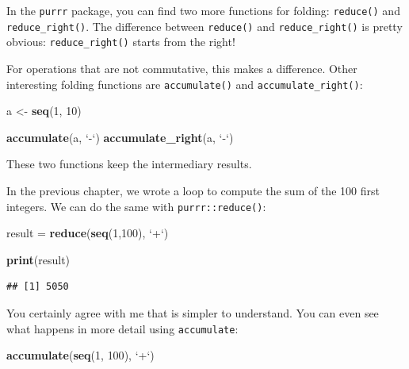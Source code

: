 \documentclass[]{gitbook}
\newenvironment{Shaded}{\begin{snugshade}}{\end{snugshade}}
\newcommand{\DataTypeTok}[1]{\textcolor[rgb]{0.13,0.29,0.53}{#1}}
\newcommand{\DecValTok}[1]{\textcolor[rgb]{0.00,0.00,0.81}{#1}}
\newcommand{\KeywordTok}[1]{\textcolor[rgb]{0.13,0.29,0.53}{\textbf{#1}}}
\newcommand{\NormalTok}[1]{#1}
\newcommand{\StringTok}[1]{\textcolor[rgb]{0.31,0.60,0.02}{#1}}
\theoremstyle{definition}
\theoremstyle{definition}
\theoremstyle{definition}
\theoremstyle{remark}
\begin{document}
In the \texttt{purrr} package, you can find two more functions for
folding: \texttt{reduce()} and \texttt{reduce\_right()}. The difference
between \texttt{reduce()} and \texttt{reduce\_right()} is pretty
obvious: \texttt{reduce\_right()} starts from the right!

For operations that are not commutative, this makes a difference. Other
interesting folding functions are \texttt{accumulate()} and
\texttt{accumulate\_right()}:

\begin{Shaded}
\begin{Highlighting}[]
\NormalTok{a <-}\StringTok{ }\KeywordTok{seq}\NormalTok{(}\DecValTok{1}\NormalTok{, }\DecValTok{10}\NormalTok{)}

\KeywordTok{accumulate}\NormalTok{(a, }\StringTok{`}\DataTypeTok{-}\StringTok{`}\NormalTok{)}
\KeywordTok{accumulate_right}\NormalTok{(a, }\StringTok{`}\DataTypeTok{-}\StringTok{`}\NormalTok{)}
\end{Highlighting}
\end{Shaded}

These two functions keep the intermediary results.

In the previous chapter, we wrote a loop to compute the sum of the 100
first integers. We can do the same with \texttt{purrr::reduce()}:

\begin{Shaded}
\begin{Highlighting}[]
\NormalTok{result =}\StringTok{ }\KeywordTok{reduce}\NormalTok{(}\KeywordTok{seq}\NormalTok{(}\DecValTok{1}\NormalTok{,}\DecValTok{100}\NormalTok{), }\StringTok{`}\DataTypeTok{+}\StringTok{`}\NormalTok{)}

\KeywordTok{print}\NormalTok{(result)}
\end{Highlighting}
\end{Shaded}

\begin{verbatim}
## [1] 5050
\end{verbatim}

You certainly agree with me that is simpler to understand. You can even
see what happens in more detail using \texttt{accumulate}:

\begin{Shaded}
\begin{Highlighting}[]
\KeywordTok{accumulate}\NormalTok{(}\KeywordTok{seq}\NormalTok{(}\DecValTok{1}\NormalTok{, }\DecValTok{100}\NormalTok{), }\StringTok{`}\DataTypeTok{+}\StringTok{`}\NormalTok{)}
\end{Highlighting}
\end{Shaded}
\end{document}
